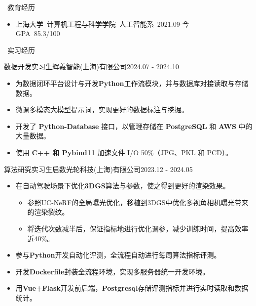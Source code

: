 \documentclass[UTF8]{resume}
\begin{document}
\begin{rSection}{\faGraduationCap~教育经历}
    \begin{itemize}
        \item 上海大学~计算机工程与科学学院~人工智能系~\hfill 2021.09-今 \\ GPA~85.3/100
    \end{itemize}
\end{rSection}
 
\begin{rSection}{\faBriefcase~实习经历}
    \begin{rExperience}{数据开发实习生}{辉羲智能(上海)有限公司}{2024.07 - 2024.10}
        \begin{itemize}
            \itemsep -0.5em \vspace{-0.5em}
            \item 为数据闭环平台设计与开发\textbf{Python}工作流模块，并与数据库对接读取与存储数据。
            \item 微调多模态大模型提示词，实现更好的数据标注与挖掘。
            \item 开发了 \textbf{Python-Database} 接口，以管理存储在 \textbf{PostgreSQL} 和 \textbf{AWS} 中的大量数据。
            \item 使用 \textbf{C++ 和 Pybind11} 加速文件 I/O 50\%（JPG、PKL 和 PCD）。
        \end{itemize}
    \end{rExperience}

    \begin{rExperience}{算法研究实习生}{启数光轮科技(上海)有限公司}{2023.12 - 2024.05}
        \begin{itemize}
            \itemsep -0.5em \vspace{-0.5em}
            \item 在自动驾驶场景下优化\textbf{3DGS}算法与参数，使之得到更好的渲染效果。
            \begin{itemize}
                \item 参照UC-NeRF的全局曝光优化，移植到3DGS中优化多视角相机曝光带来的渲染裂纹。
                \item 将迭代次数减半后，保证指标地进行优化调参，减少训练时间，提高效率近40\%。
            \end{itemize}
            \item 参与\textbf{Python}开发自动化评测，全流程自动进行每周算法指标评测。
            \item 开发\textbf{Dockerfile}封装全流程环境，实现多服务器统一开发环境。
            \item 用\textbf{Vue+Flask}开发前后端，\textbf{Postgresql}存储评测指标并进行实时读取和数据统计。
        \end{itemize}
    \end{rExperience}


\end{rSection}
\end{document}
